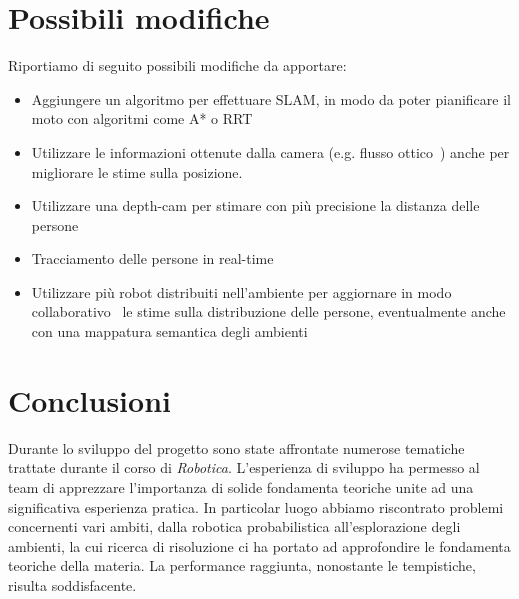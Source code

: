 \documentclass[a4paper]{article}
\begin{document}
	\section{Possibili modifiche}\label{sec:Possibli-modifiche}
	Riportiamo di seguito possibili modifiche da apportare:
	\begin{itemize}
		\item Aggiungere un algoritmo per effettuare SLAM, in modo da poter
			pianificare il moto con algoritmi come A* \cite{A*} o RRT
			\cite{RRT}
		\item Utilizzare le informazioni ottenute dalla camera (e.g. flusso
			ottico~\cite{Deng_Arif_Yang_Xi_Quan_Cai_2020}) anche per migliorare
			le stime sulla posizione.
		\item Utilizzare una depth-cam per stimare con più precisione la
			distanza delle persone
		\item Tracciamento delle persone in real-time
		\item Utilizzare più robot distribuiti nell'ambiente per aggiornare in
			modo collaborativo~\cite{miner2007swarm} le stime sulla
			distribuzione delle persone, eventualmente anche con una mappatura
			semantica degli ambienti~\cite{kostavelis2015semantic}
	\end{itemize}

	\section{Conclusioni}\label{sec:Conclusioni}
	Durante lo sviluppo del progetto sono state affrontate numerose tematiche
	trattate durante il corso di \textit{Robotica}. L'esperienza di sviluppo ha
	permesso al team di apprezzare l'importanza di solide fondamenta teoriche
	unite ad una significativa esperienza pratica. In particolar luogo abbiamo
	riscontrato problemi concernenti vari ambiti, dalla robotica probabilistica
	all'esplorazione degli ambienti, la cui ricerca di risoluzione ci ha
	portato ad approfondire le fondamenta teoriche della materia. La
	performance raggiunta, nonostante le tempistiche, risulta soddisfacente.
	
	\newpage
	
	
\end{document}
